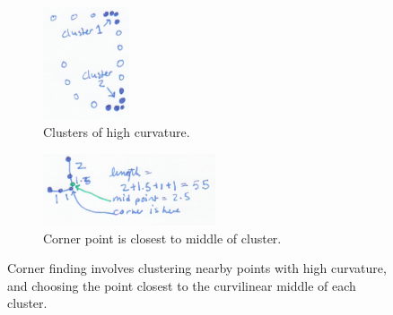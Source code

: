 \begin{figure}
  \centering
  \begin{subfigure}[t]{0.4\textwidth}
    \centering
    \includegraphics[width=1in]{img/corner-clusters.png}
    \caption{Clusters of high curvature.}
    \label{fig:corner-clusters}
  \end{subfigure}
  \hspace{1cm} %
  \begin{subfigure}[t]{0.4\textwidth}
    \centering
    \includegraphics[width=2in]{img/corner-isolation.png}
    \caption{Corner point is closest to middle of cluster.}
    \label{fig:corner-isolation}
  \end{subfigure}
  \caption[Corner finding]{Corner finding involves clustering nearby
    points with high curvature, and choosing the point closest to the
    curvilinear middle of each cluster.}
  \label{fig:corner-finding}
\end{figure}
